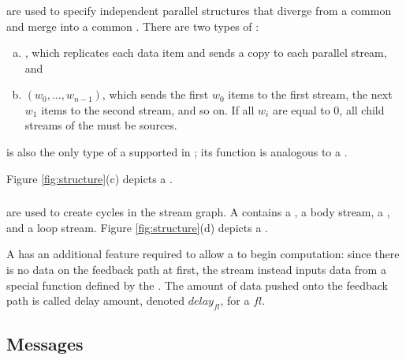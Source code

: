\subsubsection{\splitjoins}

{\splitjoins} are used to specify independent parallel structures
that diverge from a common {\splitter} and merge into a common
{\joiner}.  There are two types of {\splitters}:
\begin{enumerate}[(a)]
\item %
{\duplicate}, which replicates each data item and sends a copy to
each parallel stream, and

\item %
{\roundrobin} $(w_0,\dots, w_{n-1})$, which sends the first $w_0$
items to the first stream, the next $w_1$ items to the second
stream, and so on.  If all $w_i$ are equal to $0$, all child
streams of the {\splitjoin} must be sources.
\end{enumerate}

{\roundrobin} is also the only type of a {\joiner} supported in
{\StreamIt}; its function is analogous to a {\roundrobin} {\splitter}.

Figure \ref{fig:structure}(c) depicts a
{\splitjoin}.

\subsubsection{\feedbackloops}
\label{sec:explain-fl}

{\feedbackloops} are used to create cycles in the stream graph. A
{\feedbackloop} contains a {\joiner}, a body stream, a {\splitter}, and
a loop stream.  Figure \ref{fig:structure}(d) depicts a
{\feedbackloop}.

A {\feedbackloop} has an additional feature required to allow a
{\feedbackloop} to begin computation: since there is no data on
the feedback path at first, the stream instead inputs data from a
special function defined by the {\feedbackloop}.  The amount of
data pushed onto the feedback path is called delay amount, denoted
$delay_{fl}$, for a {\feedbackloop} $fl$.

\subsection{Messages}
\label{sec:streamit:messages}

